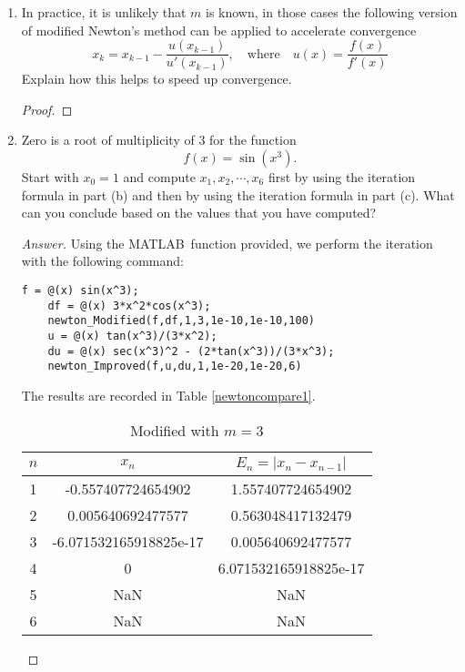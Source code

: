 \begin{enumerate}
\begin{proof}
	\end{proof}
	\item In practice, it is unlikely that $m$ is known, in those cases the following version of modified Newton's method can be applied to accelerate convergence
	\[ x_k=x_{k-1}-\frac{u(x_{k-1})}{u'(x_{k-1})}, \quad \text{where} \quad u(x)=\frac{f(x)}{f'(x)} \]
	Explain how this helps to speed up convergence.
	\begin{proof}
		
	\end{proof}
	\item Zero is a root of multiplicity of 3 for the function
	\[ f(x)=\sin(x^3). \]
	Start with \(x_0=1\) and compute \(x_1, x_2, \cdots, x_6\) first by using the iteration formula in part (b) and then by using the iteration formula in part (c).
	What can you conclude based on the values that you have computed?
	\begin{proof}[Answer]
	Using the MATLAB\texttrademark\ function provided, we perform the iteration with the following command:
	\begin{lstlisting}[style=Matlab-editor]
	f = @(x) sin(x^3);
	df = @(x) 3*x^2*cos(x^3);
	newton_Modified(f,df,1,3,1e-10,1e-10,100)
	u = @(x) tan(x^3)/(3*x^2);
	du = @(x) sec(x^3)^2 - (2*tan(x^3))/(3*x^3);
	newton_Improved(f,u,du,1,1e-20,1e-20,6)
	\end{lstlisting}
	The results are recorded in Table \ref{newtoncompare1}.
	\begin{table}[htbp]
		\begin{subtable}[t]{.49\linewidth}
			\centering
			\caption{Modified with \(m=3\)}
			\begin{tabular}[t]{|c|c|c|}
			\hline
			\normalsize	$n$	&	\normalsize	\(x_n\)	&	\normalsize	\(E_n=|x_n-x_{n-1}|\)	\\	\hline
			\scriptsize	1	&	\scriptsize	-0.557407724654902		&	\scriptsize	1.557407724654902	\\	\hline
			\scriptsize	2	&	\scriptsize	0.005640692477577		&	\scriptsize	0.563048417132479	\\	\hline
			\scriptsize	3	&	\scriptsize	-6.071532165918825e-17	&	\scriptsize	0.005640692477577	\\	\hline
			\scriptsize	4	&	\scriptsize	0						&	\scriptsize	6.071532165918825e-17	\\	\hline
			\scriptsize	5	&	\scriptsize	NaN						&	\scriptsize	NaN	\\	\hline
			\scriptsize	6	&	\scriptsize	NaN						&	\scriptsize	NaN	\\	\hline

\end{tabular}
\end{subtable}
\end{table}
\end{proof}
\end{enumerate}
